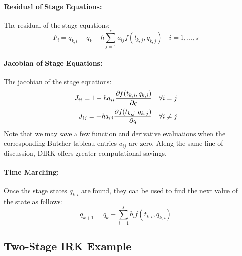 \documentclass[pdftex,11pt,letter]{article}
\begin{document}
\paragraph{Residual of Stage Equations:}
 The residual of the stage equations:
\begin{equation}
  F_i = q_{k,i} - q_{k} - h \sum_{j=1}^s a_{ij} f(t_{k,j}, q_{k,j}) \quad i = 1,\ldots,s 
\end{equation}
\paragraph{Jacobian of Stage Equations:}
The jacobian of the stage equations:
\begin{equation}
  \begin{split}
    J_{ii} = 1 - h a_{ii} \dfrac{\partial f(t_{k,i}, q_{k,i})}{\partial q} \quad \forall i = j \\
    J_{ij} = - h a_{ij} \dfrac{\partial f(t_{k,j}, q_{k,j})}{\partial q} \quad \forall i \ne j
  \end{split}
\end{equation}
Note that we may save a few function and derivative evaluations when
the corresponding Butcher tableau entries $a_{ij}$ are zero. Along the
same line of discussion, DIRK offers greater computational savings.

\paragraph{Time Marching:}
Once the stage states $q_{k,i}$ are found, they can be used to find the next
value of the state as follows:
\begin{equation}
  q_{k+1} = q_{k} + \sum_{i=1}^s b_i f(t_{k,i},q_{k,i})
\end{equation}

\subsection{Two-Stage IRK Example}
\end{document}
